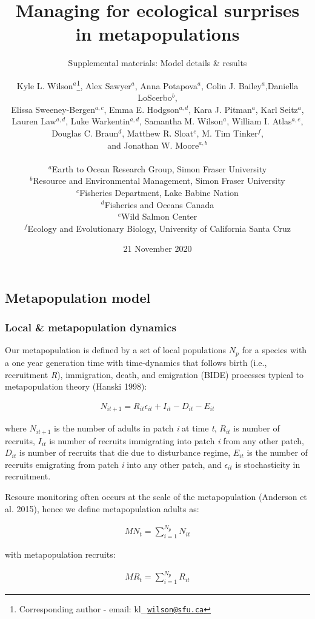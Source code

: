 \documentclass[
]{article}
\title{Managing for ecological surprises in metapopulations}
\subtitle{Supplemental materials: Model details \& results}
\author{Kyle L. Wilson\(^a\)\footnote{Corresponding author - email:
  kl\_\href{mailto:wilson@sfu.ca}{\nolinkurl{wilson@sfu.ca}}}, Alex
Sawyer\(^a\), Anna Potapova\(^a\), Colin J. Bailey\(^a\),Daniella
LoScerbo\(^b\),\\
Elissa Sweeney-Bergen\(^{a,c}\), Emma E. Hodgson\(^{a,d}\), Kara J.
Pitman\(^a\), Karl Seitz\(^a\),\\
Lauren Law\(^{a,d}\), Luke Warkentin\(^{a,d}\), Samantha M.
Wilson\(^a\), William I. Atlas\(^{a,e}\),\\
Douglas C. Braun\(^d\), Matthew R. Sloat\(^e\), M. Tim Tinker\(^f\),\\
and Jonathan W. Moore\(^{a,b}\)\\
~\\
\(^a\)Earth to Ocean Research Group, Simon Fraser University\\
\(^b\)Resource and Environmental Management, Simon Fraser University\\
\(^c\)Fisheries Department, Lake Babine Nation\\
\(^d\)Fisheries and Oceans Canada\\
\(^e\)Wild Salmon Center\\
\(^f\)Ecology and Evolutionary Biology, University of California Santa
Cruz}
\date{21 November 2020}
\begin{document}
\maketitle

\centering
\raggedright
\tableofcontents
\newpage

\pagestyle{fancy}

\hypertarget{metapopulation-model}{%
\subsection{Metapopulation model}\label{metapopulation-model}}

\hypertarget{local-metapopulation-dynamics}{%
\subsubsection{Local \& metapopulation
dynamics}\label{local-metapopulation-dynamics}}

Our metapopulation is defined by a set of local populations \(N_p\) for
a species with a one year generation time with time-dynamics that
follows birth (i.e., recruitment \emph{R}), immigration, death, and
emigration (BIDE) processes typical to metapopulation theory (Hanski
1998):

\begin{align}
N_{i{t+1}}= R_{it}\epsilon_{it}+I_{it}-D_{it}-E_{it}
\end{align}

where \(N_{it+1}\) is the number of adults in patch \emph{i} at time
\emph{t}, \(R_{it}\) is number of recruits, \(I_{it}\) is number of
recruits immigrating into patch \emph{i} from any other patch,
\(D_{it}\) is number of recruits that die due to disturbance regime,
\(E_{it}\) is the number of recruits emigrating from patch \emph{i} into
any other patch, and \(\epsilon_{it}\) is stochasticity in recruitment.

Resoure monitoring often occurs at the scale of the metapopulation
(Anderson et al. 2015), hence we define metapopulation adults as:

\begin{align}
{MN}_t = \sum_{i=1}^{N_p} N_{it}
\end{align}

with metapopulation recruits:

\begin{align}
MR_t = \sum_{i=1}^{N_p} R_{it}
\end{align}
\end{document}
